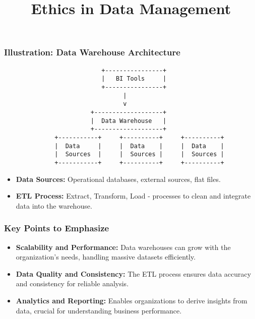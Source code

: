 \documentclass[aspectratio=169]{beamer}
\begin{document}
\begin{frame}[fragile]
    \frametitle{Illustration: Data Warehouse Architecture}
    \begin{center}
        \begin{verbatim}
                           +----------------+
                           |   BI Tools     |
                           +----------------+
                                 |
                                 v
                        +-------------------+
                        |  Data Warehouse   |
                        +-------------------+
              +-----------+     +----------+     +----------+
              |  Data     |     |  Data    |     |  Data    |
              |  Sources  |     |  Sources |     |  Sources |
              +-----------+     +----------+     +----------+
        \end{verbatim}
    \end{center}
    
    \begin{itemize}
        \item \textbf{Data Sources:} Operational databases, external sources, flat files.
        \item \textbf{ETL Process:} Extract, Transform, Load - processes to clean and integrate data into the warehouse.
    \end{itemize}
\end{frame}

\begin{frame}[fragile]
    \frametitle{Key Points to Emphasize}
    \begin{itemize}
        \item \textbf{Scalability and Performance:} Data warehouses can grow with the organization's needs, handling massive datasets efficiently.
        \item \textbf{Data Quality and Consistency:} The ETL process ensures data accuracy and consistency for reliable analysis.
        \item \textbf{Analytics and Reporting:} Enables organizations to derive insights from data, crucial for understanding business performance.
    \end{itemize}
\end{frame}

\begin{frame}[fragile]
    \title{Ethics in Data Management}
    \maketitle
\end{frame}
\end{document}
